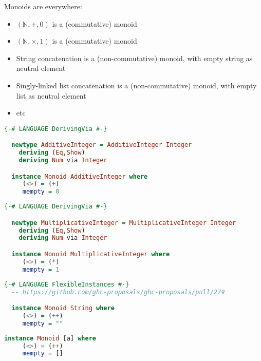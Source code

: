 \documentclass[10pt]{beamer}
\providecommand{\N}{\mathbb{N}}
\begin{document}
\begin{frame}
  Monoids are everywhere:
  \begin{itemize}
    \item $(\N, +, 0)$ is a (commutative) monoid
    \item $(\N, \times , 1)$ is a (commutative) monoid
    \item String concatenation is a (non-commutative) monoid, with empty string as neutral element
    \item Singly-linked list concatenation is a (non-commutative) monoid, with empty list as neutral element
    \item etc
  \end{itemize}
\end{frame}

\begin{frame}[fragile]
  \begin{lstlisting}[language=haskell]
  {-# LANGUAGE DerivingVia #-}

  newtype AdditiveInteger = AdditiveInteger Integer
    deriving (Eq,Show)
    deriving Num via Integer

  instance Monoid AdditiveInteger where
     (<>) = (+)
     mempty = 0
  \end{lstlisting}
\end{frame}
\begin{frame}[fragile]
  \begin{lstlisting}[language=haskell]
  {-# LANGUAGE DerivingVia #-}

  newtype MultiplicativeInteger = MultiplicativeInteger Integer
    deriving (Eq,Show)
    deriving Num via Integer

  instance Monoid MultiplicativeInteger where
     (<>) = (*)
     mempty = 1
  \end{lstlisting}
\end{frame}

\begin{frame}[fragile]
  \begin{lstlisting}[language=haskell]
  {-# LANGUAGE FlexibleInstances #-} 
  -- https://github.com/ghc-proposals/ghc-proposals/pull/279

  instance Monoid String where
     (<>) = (++)
     mempty = ""
  \end{lstlisting}
\end{frame}

\begin{frame}[fragile]
  \begin{lstlisting}[language=haskell]
  instance Monoid [a] where
     (<>) = (++)
     mempty = []
  \end{lstlisting}
\end{frame}
\end{document}
